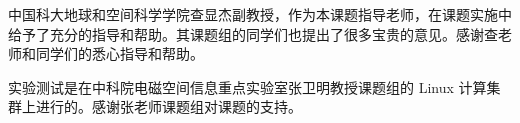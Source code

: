 \begin{acknowledgements}

中国科大地球和空间科学学院查显杰副教授，作为本课题指导老师，在课题实施中给予了充分的指导和帮助。其课题组的同学们也提出了很多宝贵的意见。感谢查老师和同学们的悉心指导和帮助。

实验测试是在中科院电磁空间信息重点实验室张卫明教授课题组的 Linux 计算集群上进行的。感谢张老师课题组对课题的支持。

\end{acknowledgements}
